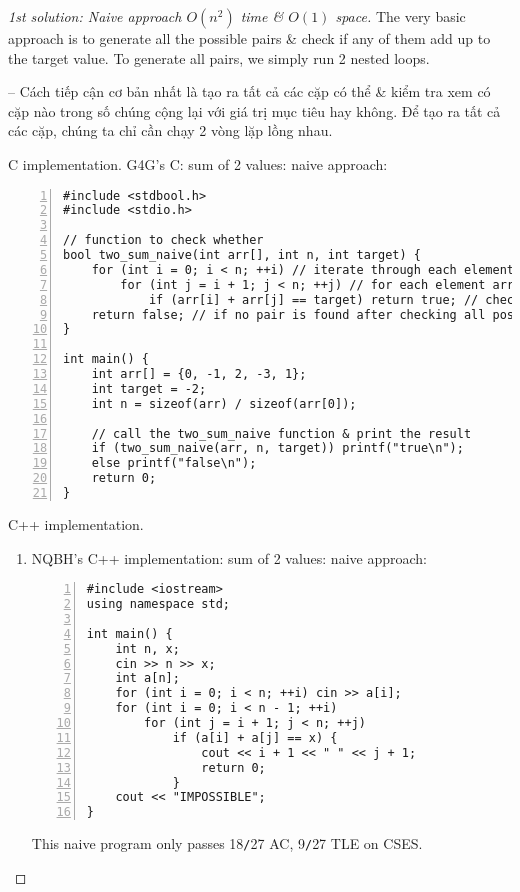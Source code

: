 \documentclass{article}
\begin{document}
\begin{proof}[1st solution: Naive approach $O(n^2)$ time \& $O(1)$ space]
    The very basic approach is to generate all the possible pairs \& check if any of them add up to the target value. To generate all pairs, we simply run 2 nested loops.

    -- Cách tiếp cận cơ bản nhất là tạo ra tất cả các cặp có thể \& kiểm tra xem có cặp nào trong số chúng cộng lại với giá trị mục tiêu hay không. Để tạo ra tất cả các cặp, chúng ta chỉ cần chạy 2 vòng lặp lồng nhau.
    \item {\sf C implementation.} G4G's C: sum of 2 values: naive approach:
    \begin{Verbatim}[numbers=left,xleftmargin=5mm]
#include <stdbool.h>
#include <stdio.h>

// function to check whether
bool two_sum_naive(int arr[], int n, int target) {
    for (int i = 0; i < n; ++i) // iterate through each element in the array
        for (int j = i + 1; j < n; ++j) // for each element arr[i], check every other element arr[j] that comes after it
            if (arr[i] + arr[j] == target) return true; // check if the sum of the current pair equals the target
    return false; // if no pair is found after checking all possibilities
}

int main() {
    int arr[] = {0, -1, 2, -3, 1};
    int target = -2;
    int n = sizeof(arr) / sizeof(arr[0]);

    // call the two_sum_naive function & print the result
    if (two_sum_naive(arr, n, target)) printf("true\n");
    else printf("false\n");
    return 0;
}
    \end{Verbatim}
    \item {\sf C++ implementation.}
    \begin{enumerate}
        \item NQBH's C++ implementation: sum of 2 values: naive approach:
        \begin{Verbatim}[numbers=left,xleftmargin=5mm]
#include <iostream>
using namespace std;

int main() {
    int n, x;
    cin >> n >> x;
    int a[n];
    for (int i = 0; i < n; ++i) cin >> a[i];
    for (int i = 0; i < n - 1; ++i)
        for (int j = i + 1; j < n; ++j)
            if (a[i] + a[j] == x) {
                cout << i + 1 << " " << j + 1;
                return 0;
            }
    cout << "IMPOSSIBLE";
}
        \end{Verbatim}
        This naive program only passes 18{\tt/}27 AC, 9{\tt/}27 TLE on CSES.


\end{enumerate}
\end{proof}
\end{document}
